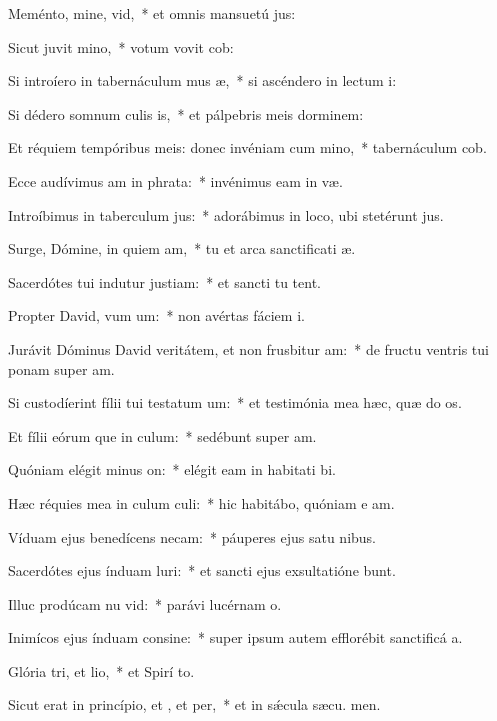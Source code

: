 \item Meménto, mine, vid,~* et omnis mansuetú jus:
\item Sicut juvit mino,~* votum vovit  cob:
\item Si introíero in tabernáculum mus æ,~* si ascéndero in lectum  i:
\item Si dédero somnum culis is,~* et pálpebris meis dorminem:
\item Et réquiem tempóribus meis: donec invéniam cum mino,~* tabernáculum  cob.
\item Ecce audívimus am in phrata:~* invénimus eam in  væ.
\item Introíbimus in taberculum jus:~* adorábimus in loco, ubi stetérunt  jus.
\item Surge, Dómine, in quiem am,~* tu et arca sanctificati æ.
\item Sacerdótes tui indutur justiam:~* et sancti tu tent.
\item Propter David, vum um:~* non avértas fáciem  i.
\item Jurávit Dóminus David veritátem, et non frusbitur am:~* de fructu ventris tui ponam super  am.
\item Si custodíerint fílii tui testatum um:~* et testimónia mea hæc, quæ do os.
\item Et fílii eórum que in culum:~* sedébunt super  am.
\item Quóniam elégit minus on:~* elégit eam in habitati bi.
\item Hæc réquies mea in culum culi:~* hic habitábo, quóniam e am.
\item Víduam ejus benedícens necam:~* páuperes ejus satu nibus.
\item Sacerdótes ejus índuam luri:~* et sancti ejus exsultatióne bunt.
\item Illuc prodúcam nu vid:~* parávi lucérnam  o.
\item Inimícos ejus índuam consine:~* super ipsum autem efflorébit sanctificá a.
\item Glória tri, et lio,~* et Spirí to.
\item Sicut erat in princípio, et , et per,~* et in sǽcula sæcu. men.
